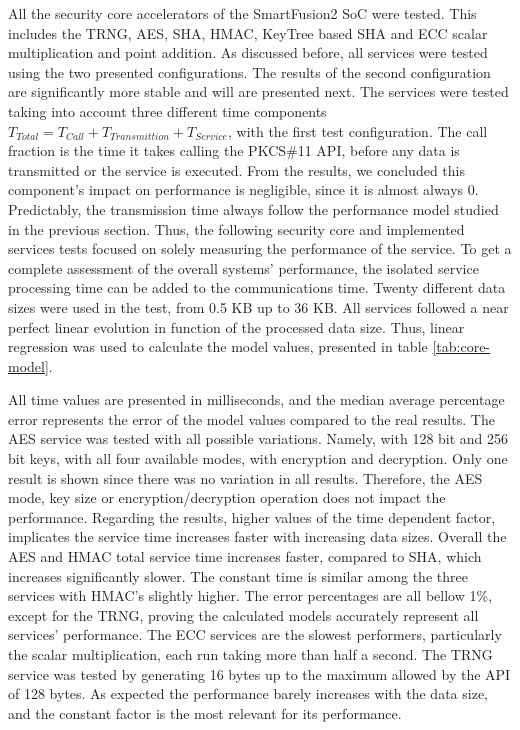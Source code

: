 All the security core accelerators of the SmartFusion2 SoC were tested. This includes the \ac{TRNG}, \ac{AES}, \ac{SHA}, \ac{HMAC}, KeyTree based \ac{SHA} and \ac{ECC} scalar multiplication and point addition.
As discussed before, all services were tested using the two presented configurations. The results of the second configuration are significantly more stable and will are presented next.
The services were tested taking into account three different time components \(T_{Total} = T_{Call} + T_{Transmittion} + T_{Service}\), with the first test configuration. The call fraction is the time it takes calling the PKCS\#11 API, before any data is transmitted or the service is executed. From the results, we concluded this component's impact on performance is negligible, since it is almost always 0.
Predictably, the transmission time always follow the performance model studied in the previous section.
Thus, the following security core and implemented services tests focused on solely measuring the performance of the service. To get a complete assessment of the overall systems' performance, the isolated service processing time can be added to the communications time.
Twenty different data sizes were used in the test, from 0.5 KB up to 36 KB.
All services followed a near perfect linear evolution in function of the processed data size. Thus, linear regression was used to calculate the model values, presented in table \ref{tab:core-model}.



All time values are presented in milliseconds, and the median average percentage error represents the error of the model values compared to the real results.
The \ac{AES} service was tested with all possible variations. Namely, with 128 bit and 256 bit keys, with all four available modes, with encryption and decryption. Only one result is shown since there was no variation in all results. Therefore, the \ac{AES} mode, key size or encryption/decryption operation does not impact the performance.
Regarding the results, higher values of the time dependent factor, implicates the service time increases faster with increasing data sizes. Overall the \ac{AES} and \ac{HMAC} total service time increases faster, compared to \ac{SHA}, which increases significantly slower. The constant time is similar among the three services with \ac{HMAC}'s slightly higher.
The error percentages are all bellow 1\%, except for the TRNG, proving the calculated models accurately represent all services' performance.
The \ac{ECC} services are the slowest performers, particularly the scalar multiplication, each run taking more than half a second.
The TRNG service was tested by generating 16 bytes up to the maximum allowed by the API of 128 bytes. As expected the performance barely increases with the data size, and the constant factor is the most relevant for its performance.

